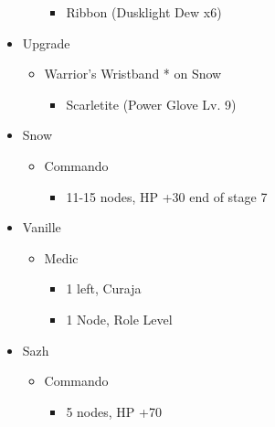 \begin{paracol}{2}
\begin{upgrade}
\begin{itemize}
\begin{itemize}
\begin{itemize}
            \item Ribbon (Dusklight Dew x6)
        \end{itemize}
    \end{itemize}
    \item Upgrade
    \begin{itemize}
        \item Warrior's Wristband * on Snow
        \begin{itemize}
            \item Scarletite (Power Glove Lv. 9)
        \end{itemize}
    \end{itemize}
\end{itemize}
\end{upgrade}
\switchcolumn*
	\begin{menu}
		\begin{itemize}
			\crystarium
			\begin{itemize}
				\item Snow
				      \begin{itemize}
					      \item Commando
					            \begin{itemize}
						            \item 11-15 nodes, HP +30 end of stage 7
					            \end{itemize}
				      \end{itemize}
				\item Vanille
				      \begin{itemize}
					      \item Medic
					            \begin{itemize}
						            \item 1 left, Curaja
						            \item 1 Node, Role Level
					            \end{itemize}
				      \end{itemize}
				\item Sazh
				      \begin{itemize}
					      \item Commando
					            \begin{itemize}
						            \item 5 nodes, HP +70
					            \end{itemize}
				      \end{itemize}
			\end{itemize}
			\equip
			\begin{itemize}

\end{itemize}
\end{itemize}
\end{menu}
\end{paracol}
